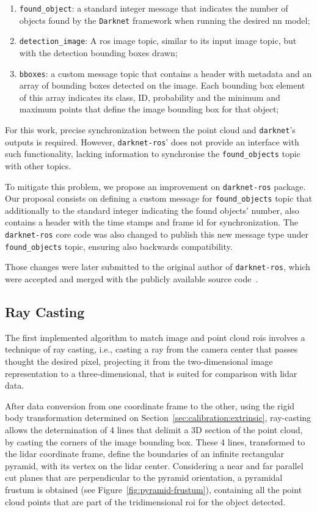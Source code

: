 \begin{enumerate}
	\item \texttt{found\_object}: a standard integer message that indicates the number of objects found by the \texttt{Darknet} framework when running the desired \ac{nn} model;
	\item \texttt{detection\_image}: A \ac{ros} image topic, similar to its input image topic, but with the detection bounding boxes drawn;
	\item \texttt{bboxes}: a custom message topic that contains a header with metadata and an array of bounding boxes detected on the image. Each bounding box element of this array indicates its class, ID, probability and the minimum and maximum points that define the image bounding box for that object;
\end{enumerate}

For this work, precise synchronization between the point cloud and \texttt{darknet}'s outputs is required. However, \texttt{darknet-ros}' does not provide an interface with such functionality, lacking information to synchronise the \texttt{found\_objects} topic with other topics.

To mitigate this problem, we propose an improvement on \texttt{darknet-ros} package. Our proposal consists on defining a custom message for \texttt{found\_objects} topic that additionally to the standard integer indicating the found objects' number, also contains a header with the time stamps and frame id for synchronization. The \texttt{darknet-ros} core code was also changed to publish this new message type under \texttt{found\_objects} topic, ensuring also backwards compatibility.

Those changes were later submitted to the original author of \texttt{darknet-ros}, which were accepted and merged with the publicly available source code~\cite{MarkoBjelonic}.


\subsection{Ray Casting}
\label{subsec:object-detection:ray-casting}
The first implemented algorithm to match image and point cloud \acp{roi} involves a technique of ray casting, i.e., casting a ray from the camera center that passes thought the desired pixel, projecting it from the two-dimensional image representation to a three-dimensional, that is suited for comparison with \ac{lidar} data.

After data conversion from one coordinate frame to the other, using the rigid body transformation determined on Section~\ref{sec:calibration:extrinsic}, ray-casting allows the determination of 4 lines that delimit a 3D section of the point cloud, by casting the corners of the image bounding box. These 4 lines, transformed to the \ac{lidar} coordinate frame, define the boundaries of an infinite rectangular pyramid, with its vertex on the \ac{lidar} center. Considering a near and far parallel cut planes that are perpendicular to the pyramid orientation, a pyramidal frustum is obtained (see Figure~\ref{fig:pyramid-frustum}), containing all the point cloud points that are part of the tridimensional \ac{roi} for the object detected.  

